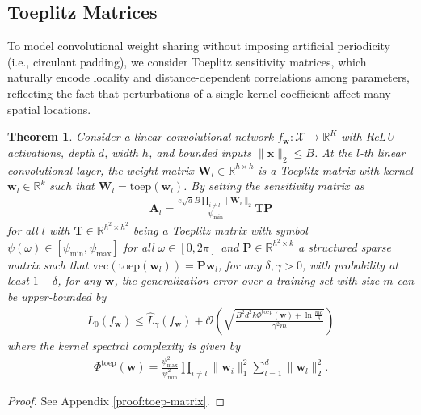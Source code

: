 \documentclass[journal]{IEEEtran} %
\newtheorem{theorem}{Theorem}%
\def\vw{{\bm{w}}}
\def\vx{{\bm{x}}}
\def\mA{{\bm{A}}}
\def\mP{{\bm{P}}}
\def\mT{{\bm{T}}}
\def\mW{{\bm{W}}}
\def\gX{{\mathcal{X}}}
\newcommand{\R}{\mathbb{R}}
\newcommand{\Norm}[1]{\|#1\|}
\begin{document}
\subsection{Toeplitz Matrices}
To model convolutional weight sharing without imposing artificial periodicity (i.e., circulant padding), we consider Toeplitz sensitivity matrices, which naturally encode locality and distance-dependent correlations among parameters, reflecting the fact that perturbations of a single kernel coefficient affect many spatial locations.

\begin{theorem} \label{thm:toep-matrix}
    Consider a linear convolutional network $f_{\vw}: \gX \to \R^K$ with ReLU activations, depth $d$, width $h$, and bounded inputs $\Norm{\vx}_2 \le B$. At the $l$-th linear convolutional layer, the weight matrix $\mW_l \in \R^{h \times h}$ is a Toeplitz matrix with kernel $\vw_l \in \R^k$ such that $\mW_l=\mathrm{toep}(\vw_l)$. By setting the sensitivity matrix as
    \begin{align}
        {\mA}_l =  \frac{ e\sqrt{d}B  \prod_{i\ne l} \Norm{\mW_i}_2}{\psi_{\min}}\mT \mP
    \end{align}
    for all $l$ with $\mT \in \R^{h^2 \times h^2}$ being a Toeplitz matrix with symbol $\psi(\omega) \in [\psi_{\min},\psi_{\max}]$ for all $\omega \in [0,2\pi]$ and $\mP \in \R^{h^2 \times k}$ a structured sparse matrix such that $\mathrm{vec}({\mathrm{toep}(\vw_l)})=\mP \vw_l$, for any $\delta,\gamma>0$, with probability at least $1-\delta$, for any $\vw$, the generalization error over a training set with size $m$ can be upper-bounded by 
\begin{align}
    L_0(f_{\vw}) \le \hat{L}_{\gamma}(f_{\vw}) + \mathcal{O} \left( \sqrt{ \frac{B^2d^2k \Phi^{\mathrm{toep}}(\vw) + \ln \frac{md}{\delta}}{\gamma^2m}} \right)
\end{align}
where the kernel spectral complexity is given by
\begin{align}
    \Phi^{\mathrm{toep}}(\vw)=\frac{\psi_{\max}^2}{\psi_{\min}^2} \prod_{i\ne l} \Norm{\vw_i}_1^2 \sum_{l=1}^d \Norm{\vw_l}_2^2. 
\end{align}
\end{theorem}
\begin{proof}
    See Appendix \ref{proof:toep-matrix}.
\end{proof}
\end{document}
